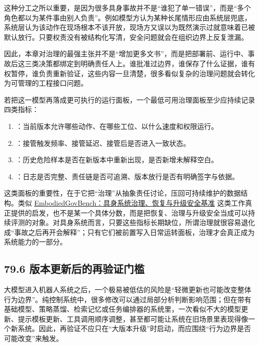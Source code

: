 这种分工之所以重要，是因为很多具身事故并不是“谁犯了单一错误”，而是“多个角色都以为某件事由别人负责”。例如模型方认为某种长尾情形应由系统层兜底，系统层认为该动作在现场根本不该开放，现场方又误以为既然演示过就意味着已被默认放行。只要权责没有被结构化写清，安全问题就会在组织边界上反复泄漏。

因此，本章对治理的最强主张并不是“增加更多文书”，而是把部署前、运行中、事故后这三类决策都绑定到明确责任人上。谁批准过边界，谁保存了什么证据，谁有权暂停，谁负责重新验证，这些内容一旦清楚，很多看似复杂的治理问题就会转化为可管理的工程接口问题。

若把这一模型再落成更可执行的运行面板，一个最低可用治理面板至少应持续记录四类指标：

\begin{enumerate}
\item \texttt{}：当前版本允许哪些动作、在哪些工位、以什么速度和权限运行。
\item \texttt{}：接管触发频率、接管延迟、接管后是否进入一致状态。
\item \texttt{}：历史危险样本是否在新版本中重新出现，是否新增未解释空白。
\item \texttt{}：日志是否完整、责任链是否可追溯、版本放行是否有明确签字与依据。
\end{enumerate}

这类面板的重要性，在于它把“治理”从抽象责任讨论，压回可持续维护的数据结构。类似 \href{https://arxiv.org/abs/2604.11174}{EmbodiedGovBench：具身系统治理、恢复与升级安全基准} 这类工作真正提供的启发，也不是某一个具体分数，而是把恢复、治理与升级安全当成可以持续评测的对象。对具身系统而言，只要这些指标长期缺位，所谓治理就很容易退化成“事故之后再开会解释”；只有它们被前置写入日常运转面板，治理才会真正成为系统能力的一部分。

\subsection*{79.6 版本更新后的再验证门槛}


大模型进入机器人系统之后，一个极易被低估的风险是“轻微更新也可能改变整体行为边界”。纯控制系统中，很多修改可以通过局部分析判断影响范围；但在带有基础模型、策略蒸馏、检索记忆或任务编排器的系统里，一次看似不大的模型更新、提示模板更新、工具调用顺序调整，甚至都可能让系统在旧场景里表现得像一个新系统。因此，再验证不应只在“大版本升级”时启动，而应围绕“行为边界是否可能改变”来触发。

